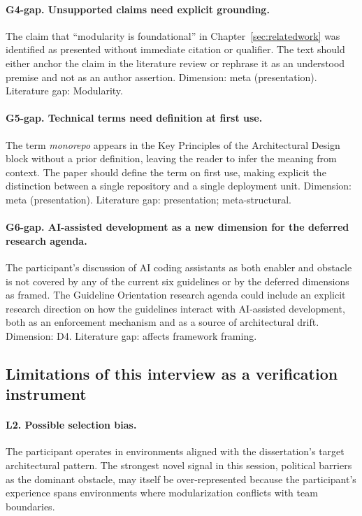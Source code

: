 \paragraph*{G4-gap. Unsupported claims need explicit grounding.} The claim that ``modularity is foundational'' in Chapter~\ref{sec:relatedwork} was identified as presented without immediate citation or qualifier. The text should either anchor the claim in the literature review or rephrase it as an understood premise and not as an author assertion. Dimension: meta (presentation). Literature gap: Modularity.

\paragraph*{G5-gap. Technical terms need definition at first use.} The term \emph{monorepo} appears in the Key Principles of the Architectural Design block without a prior definition, leaving the reader to infer the meaning from context. The paper should define the term on first use, making explicit the distinction between a single repository and a single deployment unit. Dimension: meta (presentation). Literature gap: presentation; meta-structural.

\paragraph*{G6-gap. AI-assisted development as a new dimension for the deferred research agenda.} The participant's discussion of AI coding assistants as both enabler and obstacle is not covered by any of the current six guidelines or by the deferred dimensions as framed. The Guideline Orientation research agenda could include an explicit research direction on how the guidelines interact with AI-assisted development, both as an enforcement mechanism and as a source of architectural drift. Dimension: D4. Literature gap: affects framework framing.

\subsection*{Limitations of this interview as a verification instrument}

\paragraph*{L2. Possible selection bias.} The participant operates in environments aligned with the dissertation's target architectural pattern. The strongest novel signal in this session, political barriers as the dominant obstacle, may itself be over-represented because the participant's experience spans environments where modularization conflicts with team boundaries.


